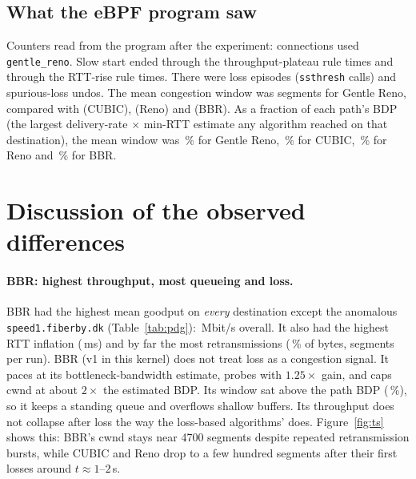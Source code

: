 \documentclass[11pt]{article}
\newcommand{\alg}[1]{\texttt{#1}}
\newcommand{\GR}{Gentle Reno}
\begin{document}
\subsection{What the eBPF program saw}
Counters read from the program after the experiment:  connections used
\alg{gentle\_reno}. Slow start ended through the throughput-plateau rule  times
and through the RTT-rise rule  times. There were 
loss episodes (\texttt{ssthresh} calls) and  spurious-loss undos.
The mean congestion window was  segments for \GR{},
compared with  (CUBIC),  (Reno) and
 (BBR). As a fraction of each path's BDP (the largest
delivery-rate $\times$ min-RTT estimate any algorithm reached on that destination), the mean
window was \,\% for \GR{}, \,\% for CUBIC,
\,\% for Reno and \,\% for BBR.

\section{Discussion of the observed differences}
\label{sec:discussion}

\paragraph{BBR: highest throughput, most queueing and loss.}
BBR had the highest mean goodput on \emph{every} destination except the anomalous
\texttt{speed1.fiberby.dk} (Table~\ref{tab:pdg}): \,Mbit/s overall.
It also had the highest RTT inflation (\,ms) and by far the most
retransmissions (\,\% of bytes,  segments per run).
BBR (v1 in this kernel) does not treat loss as a congestion signal. It paces at its bottleneck-bandwidth
estimate, probes with $1.25\times$ gain, and caps cwnd at about $2\times$ the estimated BDP. Its window
sat above the path BDP (\,\%), so it keeps a standing queue and overflows
shallow buffers. Its throughput does not collapse after loss the way the loss-based
algorithms' does. Figure~\ref{fig:ts} shows this: BBR's cwnd stays near 4700 segments despite repeated
retransmission bursts, while CUBIC and Reno drop to a few hundred segments after their first losses
around $t\approx1$--$2$\,s.
\end{document}
